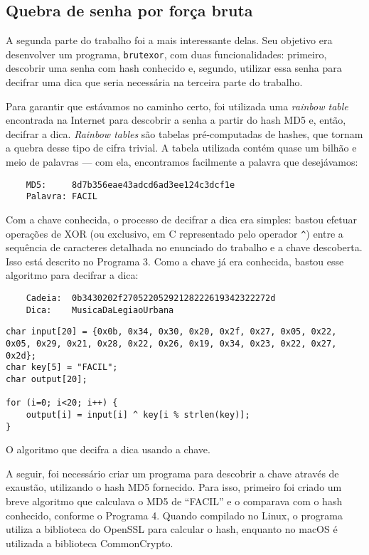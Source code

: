 \documentclass{sig-alternate-05-2015}
\begin{document}
\subsection{Quebra de senha por força bruta}
A segunda parte do trabalho foi a mais interessante delas.
Seu objetivo era desenvolver um programa, \texttt{brutexor}, com duas funcionalidades: primeiro, descobrir uma senha com hash conhecido e, segundo, utilizar essa senha para decifrar uma dica que seria necessária na terceira parte do trabalho.

Para garantir que estávamos no caminho certo, foi utilizada uma \textit{rainbow table} encontrada na Internet para descobrir a senha a partir do hash MD5 e, então, decifrar a dica.
\textit{Rainbow tables} são tabelas pré-computadas de hashes, que tornam a quebra desse tipo de cifra trivial.
A tabela utilizada contém quase um bilhão e meio de palavras — com ela, encontramos facilmente a palavra que desejávamos:

\begin{verbatim}
	MD5:     8d7b356eae43adcd6ad3ee124c3dcf1e
	Palavra: FACIL
\end{verbatim}

Com a chave conhecida, o processo de decifrar a dica era simples: bastou efetuar operações de XOR (ou exclusivo, em C representado pelo operador \texttt{\^}) entre a sequência de caracteres detalhada no enunciado do trabalho e a chave descoberta.
Isso está descrito no Programa 3.
Como a chave já era conhecida, bastou esse algoritmo para decifrar a dica:

\begin{verbatim}
	Cadeia:  0b3430202f27052205292128222619342322272d
	Dica:    MusicaDaLegiaoUrbana
\end{verbatim}

\begin{program}
\begin{lstlisting}
char input[20] = {0x0b, 0x34, 0x30, 0x20, 0x2f, 0x27, 0x05, 0x22, 0x05, 0x29, 0x21, 0x28, 0x22, 0x26, 0x19, 0x34, 0x23, 0x22, 0x27, 0x2d};
char key[5] = "FACIL";
char output[20];

for (i=0; i<20; i++) {
    output[i] = input[i] ^ key[i % strlen(key)];
}
\end{lstlisting}
\caption{O algoritmo que decifra a dica usando a chave.}
\end{program}

A seguir, foi necessário criar um programa para descobrir a chave através de exaustão, utilizando o hash MD5 fornecido.
Para isso, primeiro foi criado um breve algoritmo que calculava o MD5 de ``FACIL'' e o comparava com o hash conhecido, conforme o Programa 4.
Quando compilado no Linux, o programa utiliza a biblioteca do OpenSSL para calcular o hash, enquanto no macOS é utilizada a biblioteca CommonCrypto.
\end{document}
